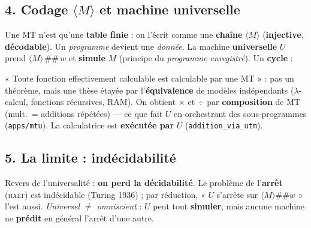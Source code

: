 \documentclass[11pt,a4paper]{scrartcl}
\begin{document}
\subsection*{4. Codage $\langle M\rangle$ et machine universelle}
Une MT n'est qu'une \textbf{table finie} : on l'écrit comme une \textbf{chaîne}
$\langle M\rangle$ (\textbf{injective}, \textbf{décodable}). Un \emph{programme} devient
une \emph{donnée}. La machine \textbf{universelle} $U$ prend $\langle M\rangle\,\#\#\,w$
et \textbf{simule} $M$ (principe du \emph{programme enregistré}). Un \textbf{cycle} :

\begin{center}
\end{center}

\begin{notion}
« Toute fonction effectivement calculable est calculable par une MT » : pas un théorème,
mais une thèse étayée par l'\textbf{équivalence} de modèles indépendants ($\lambda$-calcul,
fonctions récursives, RAM). On obtient $\times$ et $\div$ par \textbf{composition} de MT
(mult.\ = additions répétées) — ce que fait $U$ en orchestrant des sous-programmes
(\texttt{apps/mtu}). La calculatrice est \textbf{exécutée par} $U$ (\texttt{addition\_via\_utm}).
\end{notion}

\subsection*{5. La limite : indécidabilité}
Revers de l'universalité : \textbf{on perd la décidabilité}. Le problème de l'\textbf{arrêt}
(\textsc{halt}) est indécidable (Turing 1936) ; par réduction, « $U$ s'arrête sur
$\langle M\rangle\#\#w$ » l'est aussi. \emph{Universel $\neq$ omniscient} : $U$ peut tout
\textbf{simuler}, mais aucune machine ne \textbf{prédit} en général l'arrêt d'une autre.
\end{document}
